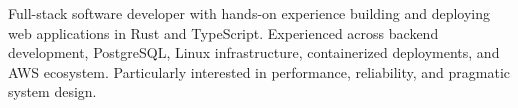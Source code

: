 Full-stack software developer with hands-on experience building and deploying web applications in Rust and TypeScript. Experienced across backend development, PostgreSQL, Linux infrastructure, containerized deployments, and AWS ecosystem. Particularly interested in performance, reliability, and pragmatic system design.